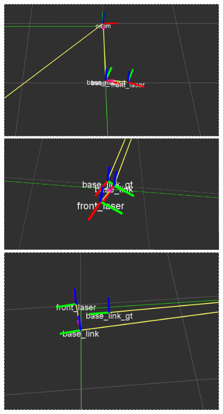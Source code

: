 \begin{figure}[!htb]
  \includegraphics[width=\linewidth]{imagenesExpLazoCerrado/k0.4/1.png}
\endminipage\hfill
{}
  \includegraphics[width=\linewidth]{imagenesExpLazoCerrado/k0.4/3.png}
\endminipage\hfill
{}%
  \includegraphics[width=\linewidth]{imagenesExpLazoCerrado/k0.4/5.png}
\endminipage
\end{figure}


